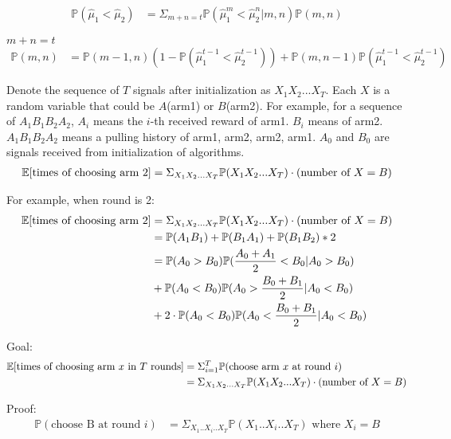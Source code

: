 \documentclass[fleqn]{article}
\def\PP{{\mathbb P}}\def\QQ{{\mathbb Q}}\def\RR{{\mathbb R}}
\begin{document}
\begin{align*}
    \PP(\hat{\mu}_1<\hat{\mu}_2) &= \Sigma_{m+n=t}\PP(\hat{\mu}_1^m<\hat{\mu}_2^n|m,n)\PP(m,n)
\end{align*}

$m+n=t$
\begin{align*}
    \PP(m,n) &= \PP(m-1, n)(1-\PP(\hat{\mu}_1^{t-1}<\hat{\mu}_2^{t-1})) + \PP(m, n-1)\PP(\hat{\mu}_1^{t-1}<\hat{\mu}_2^{t-1})
\end{align*}
\bigskip

Denote the sequence of $T$ signals after initialization as $X_1X_2...X_T$. Each $X$ is a random variable that could be $A$(arm1) or $B$(arm2). For example, for a sequence of $A_1B_1B_2A_2$,  $A_i$ means the $i$-th received reward of arm1. $B_i$ means of arm2. $A_1B_1B_2A_2$ means a pulling history of arm1, arm2, arm2, arm1. $A_0$ and $B_0$ are signals received from initialization of algorithms.
\begin{align*}
    \EE[\text{times of choosing arm 2}]=\Sigma_{X_1X_2...X_T}{\PP(X_1X_2...X_T)\cdot(\text{number of }X=B)}
\end{align*}

For example, when round is 2:
\begin{align*}
    \EE[\text{times of choosing arm 2}]&=\Sigma_{X_1X_2...X_T}{\PP(X_1X_2...X_T)\cdot(\text{number of }X=B)}\\
    &= \PP(A_1B_1) + \PP(B_1A_1) + \PP(B_1B_2)*2\\
    &= \PP(A_0>B_0)\PP(\frac{A_0+A_1}{2}<B_0|A_0>B_0)\\
    &+\PP(A_0<B_0)\PP(A_0>\frac{B_0+B_1}{2}|A_0<B_0)\\
    &+2\cdot\PP(A_0<B_0)\PP(A_0<\frac{B_0+B_1}{2}|A_0<B_0)
\end{align*}

Goal: 
\begin{align*}
\EE[\text{times of choosing arm $x$ in $T$ rounds}]&=\Sigma_{i=1}^T{\PP(\text{choose arm $x$ at round }i)}\\
&=\Sigma_{X_1X_2...X_T}{\PP(X_1X_2...X_T)\cdot(\text{number of }X=B)}
\end{align*}

Proof:
\begin{align*}
\PP(\text{choose B at round }i)&=\Sigma_{X_1..X_i..X_T}{\PP(X_1..X_i..X_T)} \text{ where } X_i=B
\end{align*}
\end{document}
